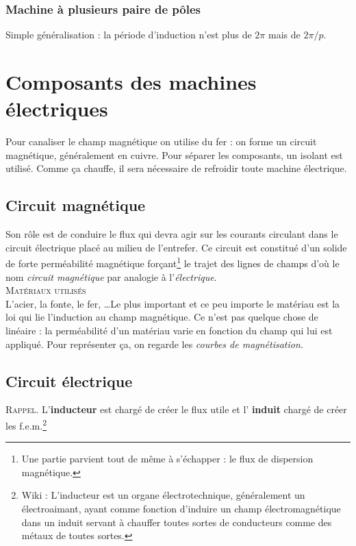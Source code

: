 		\subsubsection{Machine à plusieurs paire de pôles}
		Simple généralisation : la période d'induction n'est plus de $2\pi$ mais 
		de $2\pi/p$.
		
		
		
\section{Composants des machines électriques}
Pour canaliser le champ magnétique on utilise du fer : on forme un circuit 
magnétique, généralement en cuivre. Pour séparer les composants, un isolant 
est utilisé. Comme ça chauffe, il sera nécessaire de refroidir toute machine 
électrique.

	\subsection{Circuit magnétique}
	Son rôle est de conduire le flux qui devra agir sur les courants circulant 
	dans le circuit électrique placé au milieu de l'entrefer. Ce circuit est 
	constitué d'un solide de forte perméabilité magnétique forçant\footnote{Une 
	partie parvient tout de même à s'échapper : le flux de dispersion magnétique.} 
	le trajet des lignes de champs d'où le nom \textit{circuit magnétique} par analogie 
	à l'\textit{électrique}.\\
	
	\textsc{Matériaux utilisés}\\
	L'acier, la fonte, le fer, \dots Le plus important et ce peu importe le 
	matériau est la loi qui lie l'induction au champ magnétique. Ce n'est 
	pas quelque chose de linéaire : la perméabilité d'un matériau varie en 
	fonction du champ qui lui est appliqué. Pour représenter ça, on regarde 
	les \textit{courbes de magnétisation.}
	
	
	\subsection{Circuit électrique}
	\textsc{Rappel.} L'\textbf{inducteur} est chargé de créer le flux utile et l'
	\textbf{induit} chargé de créer les f.e.m.\footnote{Wiki : L'inducteur est un organe 
	électrotechnique, généralement un électroaimant, ayant comme fonction d'induire 
	un champ électromagnétique dans un induit servant à chauffer toutes sortes de 
	conducteurs comme des métaux de toutes sortes.}
	
